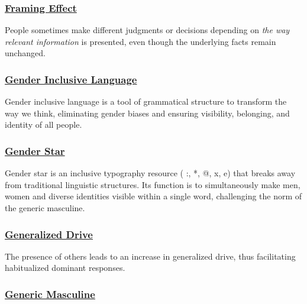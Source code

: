 \documentclass[
  letterpaper,
]{book}
\begin{document}
\subsubsection*{\texorpdfstring{\hyperref[def-framingeffect]{Framing
Effect}}{Framing Effect}}\label{framing-effect-1}

People sometimes make different judgments or decisions depending on
\emph{the way relevant information} is presented, even though the
underlying facts remain unchanged.

\subsubsection*{\texorpdfstring{\hyperref[def-genderinclusivelanguage]{Gender
Inclusive
Language}}{Gender Inclusive Language}}\label{gender-inclusive-language}

Gender inclusive language is a tool of grammatical structure to
transform the way we think, eliminating gender biases and ensuring
visibility, belonging, and identity of all people.

\subsubsection*{\texorpdfstring{\hyperref[def-genderstar]{Gender
Star}}{Gender Star}}\label{gender-star}

Gender star is an inclusive typography resource ( :, *, @, x, e) that
breaks away from traditional linguistic structures. Its function is to
simultaneously make men, women and diverse identities visible within a
single word, challenging the norm of the generic masculine.

\subsubsection*{\texorpdfstring{\hyperref[def-generalizeddrive]{Generalized
Drive}}{Generalized Drive}}\label{generalized-drive}

The presence of others leads to an increase in generalized drive, thus
facilitating habitualized dominant responses.

\subsubsection*{\texorpdfstring{\hyperref[def-genericmasculine]{Generic
Masculine}}{Generic Masculine}}\label{generic-masculine}
\end{document}

